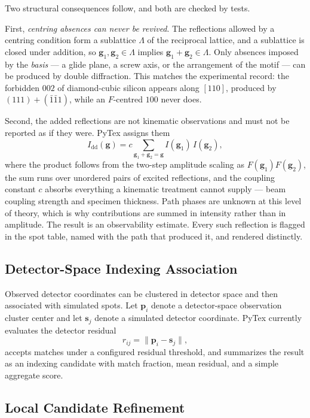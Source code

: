 Two structural consequences follow, and both are checked by tests.

First, \emph{centring absences can never be revived}. The reflections allowed by a centring condition form a sublattice $\Lambda$ of the reciprocal lattice, and a sublattice is closed under addition, so $\mathbf{g}_1, \mathbf{g}_2 \in \Lambda$ implies $\mathbf{g}_1 + \mathbf{g}_2 \in \Lambda$. Only absences imposed by the \emph{basis} --- a glide plane, a screw axis, or the arrangement of the motif --- can be produced by double diffraction. This matches the experimental record: the forbidden $002$ of diamond-cubic silicon appears along $[110]$, produced by $(111) + (\bar{1}\bar{1}1)$, while an $F$-centred $100$ never does.

Second, the added reflections are not kinematic observations and must not be reported as if they were. PyTex assigns them
\[
  I_{\mathrm{dd}}(\mathbf{g}) = c \sum_{\mathbf{g}_1 + \mathbf{g}_2 = \mathbf{g}} I(\mathbf{g}_1) \, I(\mathbf{g}_2),
\]
where the product follows from the two-step amplitude scaling as $F(\mathbf{g}_1) F(\mathbf{g}_2)$, the sum runs over unordered pairs of excited reflections, and the coupling constant $c$ absorbs everything a kinematic treatment cannot supply --- beam coupling strength and specimen thickness. Path phases are unknown at this level of theory, which is why contributions are summed in intensity rather than in amplitude. The result is an observability estimate. Every such reflection is flagged in the spot table, named with the path that produced it, and rendered distinctly.

\subsection{Detector-Space Indexing Association}

Observed detector coordinates can be clustered in detector space and then associated with simulated spots. Let $\mathbf{p}_i$ denote a detector-space observation cluster center and let $\mathbf{s}_j$ denote a simulated detector coordinate. PyTex currently evaluates the detector residual
\[
  r_{ij} = \lVert \mathbf{p}_i - \mathbf{s}_j \rVert,
\]
accepts matches under a configured residual threshold, and summarizes the result as an indexing candidate with match fraction, mean residual, and a simple aggregate score.

\subsection{Local Candidate Refinement}

